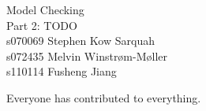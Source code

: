 \documentclass[11pt]{article}
\begin{document}
{\center \Large {} Model Checking \\[5mm]
Part 2: TODO \\[5mm]
s070069 Stephen Kow Sarquah \\
s072435 Melvin Winstrøm-Møller \\
s110114 Fusheng Jiang \\}

Everyone has contributed to everything.

\setcounter{secnumdepth}{0}

\tableofcontents










\end{document}
